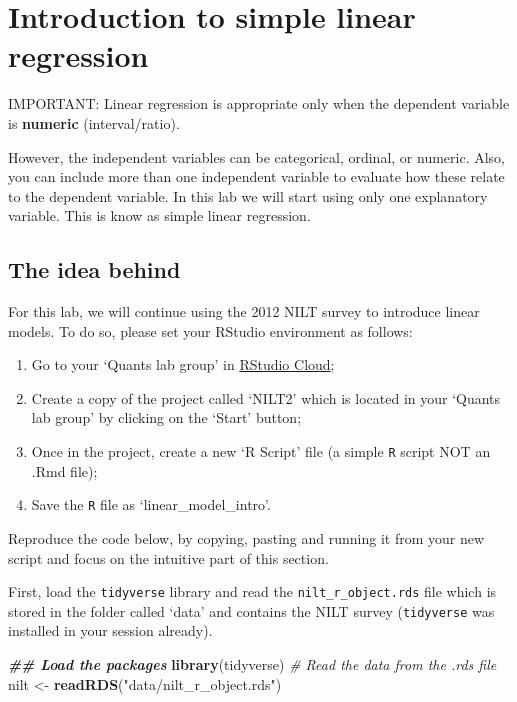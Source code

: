 \documentclass[
]{book}
\newenvironment{Shaded}{\begin{snugshade}}{\end{snugshade}}
\newcommand{\CommentTok}[1]{\textcolor[rgb]{0.56,0.35,0.01}{\textit{#1}}}
\newcommand{\DocumentationTok}[1]{\textcolor[rgb]{0.56,0.35,0.01}{\textbf{\textit{#1}}}}
\newcommand{\FunctionTok}[1]{\textcolor[rgb]{0.13,0.29,0.53}{\textbf{#1}}}
\newcommand{\NormalTok}[1]{#1}
\newcommand{\OtherTok}[1]{\textcolor[rgb]{0.56,0.35,0.01}{#1}}
\newcommand{\StringTok}[1]{\textcolor[rgb]{0.31,0.60,0.02}{#1}}
\providecommand{\tightlist}{%
  \setlength{\itemsep}{0pt}\setlength{\parskip}{0pt}}
\begin{document}
\hypertarget{introduction-to-simple-linear-regression}{%
\section{Introduction to simple linear regression}\label{introduction-to-simple-linear-regression}}

IMPORTANT: Linear regression is appropriate only when the dependent variable is \textbf{numeric} (interval/ratio).

However, the independent variables can be categorical, ordinal, or numeric. Also, you can include more than one independent variable to evaluate how these relate to the dependent variable. In this lab we will start using only one explanatory variable. This is know as simple linear regression.

\hypertarget{the-idea-behind}{%
\subsection{The idea behind}\label{the-idea-behind}}

For this lab, we will continue using the 2012 NILT survey to introduce linear models. To do so, please set your RStudio environment as follows:

\begin{enumerate}
\def\labelenumi{\arabic{enumi}.}
\tightlist
\item
  Go to your `Quants lab group' in \href{https://rstudio.cloud/}{RStudio Cloud};
\item
  Create a copy of the project called `NILT2' which is located in your `Quants lab group' by clicking on the `Start' button;
\item
  Once in the project, create a new `R Script' file (a simple \texttt{R} script NOT an .Rmd file);
\item
  Save the \texttt{R} file as `linear\_model\_intro'.
\end{enumerate}

Reproduce the code below, by copying, pasting and running it from your new script and focus on the intuitive part of this section.

First, load the \texttt{tidyverse} library and read the \texttt{nilt\_r\_object.rds} file which is stored in the folder called `data' and contains the NILT survey (\texttt{tidyverse} was installed in your session already).

\begin{Shaded}
\begin{Highlighting}[]
\DocumentationTok{\#\# Load the packages}
\FunctionTok{library}\NormalTok{(tidyverse)}
\CommentTok{\# Read the data from the .rds file}
\NormalTok{nilt }\OtherTok{\textless{}{-}} \FunctionTok{readRDS}\NormalTok{(}\StringTok{"data/nilt\_r\_object.rds"}\NormalTok{)}
\end{Highlighting}
\end{Shaded}
\end{document}
